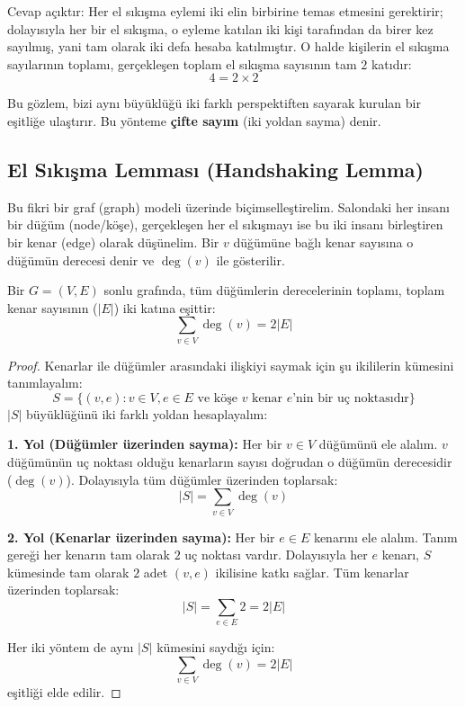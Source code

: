 Cevap açıktır: Her el sıkışma eylemi iki elin birbirine temas etmesini gerektirir; dolayısıyla her bir el sıkışma, o eyleme katılan iki kişi tarafından da birer kez sayılmış, yani tam olarak iki defa hesaba katılmıştır. O halde kişilerin el sıkışma sayılarının toplamı, gerçekleşen toplam el sıkışma sayısının tam $2$ katıdır:
\[ 4 = 2 \times 2 \]

Bu gözlem, bizi aynı büyüklüğü iki farklı perspektiften sayarak kurulan bir eşitliğe ulaştırır. Bu yönteme \textbf{çifte sayım} (iki yoldan sayma) denir.

\subsection{El Sıkışma Lemması (Handshaking Lemma)}

Bu fikri bir graf (graph) modeli üzerinde biçimselleştirelim. Salondaki her insanı bir düğüm (node/köşe), gerçekleşen her el sıkışmayı ise bu iki insanı birleştiren bir kenar (edge) olarak düşünelim. Bir $v$ düğümüne bağlı kenar sayısına o düğümün derecesi denir ve $\deg(v)$ ile gösterilir.

\begin{theorem}
Bir $G = (V, E)$ sonlu grafında, tüm düğümlerin derecelerinin toplamı, toplam kenar sayısının ($|E|$) iki katına eşittir:
\[ \sum_{v \in V} \deg(v) = 2|E| \]
\end{theorem}

\begin{proof}
Kenarlar ile düğümler arasındaki ilişkiyi saymak için şu ikililerin kümesini tanımlayalım:
\[ S = \{ (v, e) : v \in V, e \in E \text{ ve köşe } v \text{ kenar } e\text{'nin bir uç noktasıdır} \} \]
$|S|$ büyüklüğünü iki farklı yoldan hesaplayalım:

\textbf{1. Yol (Düğümler üzerinden sayma):} Her bir $v \in V$ düğümünü ele alalım. $v$ düğümünün uç noktası olduğu kenarların sayısı doğrudan o düğümün derecesidir ($\deg(v)$). Dolayısıyla tüm düğümler üzerinden toplarsak:
\[ |S| = \sum_{v \in V} \deg(v) \]

\textbf{2. Yol (Kenarlar üzerinden sayma):} Her bir $e \in E$ kenarını ele alalım. Tanım gereği her kenarın tam olarak $2$ uç noktası vardır. Dolayısıyla her $e$ kenarı, $S$ kümesinde tam olarak $2$ adet $(v, e)$ ikilisine katkı sağlar. Tüm kenarlar üzerinden toplarsak:
\[ |S| = \sum_{e \in E} 2 = 2|E| \]

Her iki yöntem de aynı $|S|$ kümesini saydığı için:
\[ \sum_{v \in V} \deg(v) = 2|E| \]
eşitliği elde edilir.
\end{proof}

